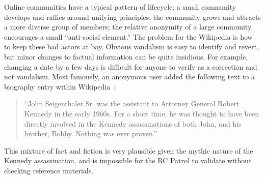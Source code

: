 Online communities have a typical pattern of lifecycle:
a small community develops and rallies around unifying principles;
the community grows and attracts a more diverse group of members;
the relative anonymity of a large community encourages
a small ``anti-social element.''
The problem for the Wikipedia is how to keep these bad actors at bay.
Obvious vandalism is easy to identify and revert,
but minor changes to factual information can be quite insidious.
For example, changing a date by a few days is difficult for anyone
to verify as a correction and not vandalism.
Most famously, an anonymous user added the following text to a biography entry
within Wikipedia~\cite{Seigenthaler05,NewYorkTimes05a,NewYorkTimes05b}:
\begin{quote}
``John Seigenthaler Sr. was the assistant to
Attorney General Robert Kennedy in the early 1960s.
For a short time, he was thought to have been directly involved
in the Kennedy assassinations of both John, and his brother, Bobby.
Nothing was ever proven.''
\end{quote}
This mixture of fact and fiction is very plausible given the
mythic nature of the Kennedy assassination, and is impossible
for the RC Patrol to validate without checking reference materials.



